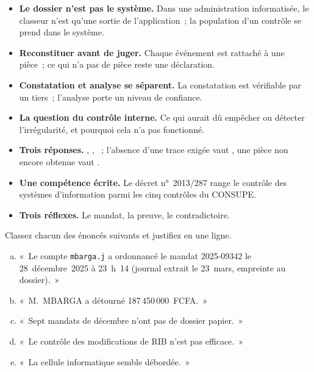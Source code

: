 \begin{boxresume}
\begin{itemize}
    \item \textbf{Le dossier n'est pas le système.} Dans une administration
          informatisée, le classeur n'est qu'une sortie de l'application~;
          la population d'un contrôle se prend dans le système.
    \item \textbf{Reconstituer avant de juger.} Chaque événement est
          rattaché à une pièce~; ce qui n'a pas de pièce reste une
          déclaration.
    \item \textbf{Constatation et analyse se séparent.} La constatation est
          vérifiable par un tiers~; l'analyse porte un niveau de
          confiance.
    \item \textbf{La question du contrôle interne.} Ce qui aurait dû
          empêcher ou détecter l'irrégularité, et pourquoi cela n'a pas
          fonctionné.
    \item \textbf{Trois réponses.} \OUI{}, \NON{}, \NEK{}~; l'absence d'une
          trace exigée vaut \NON{}, une pièce non encore obtenue vaut
          \NEK{}.
    \item \textbf{Une compétence écrite.} Le décret n°~2013/287 range le
          contrôle des systèmes d'information parmi les cinq contrôles du
          CONSUPE.
    \item \textbf{Trois réflexes.} Le mandat, la preuve, le contradictoire.
\end{itemize}
\end{boxresume}

\begin{boxexo}[title={\ding{45}\quad Exercice~P.1. Constatation ou analyse~? \niveaubase}]
Classez chacun des énoncés suivants et justifiez en une ligne.
\begin{enumerate}[(a)]
    \item «~Le compte \texttt{mbarga.j} a ordonnancé le mandat 2025-09342
          le 28~décembre~2025 à 23~h~14 (journal extrait le 23~mars,
          empreinte au dossier).~»
    \item «~M.~MBARGA a détourné 187\,450\,000~FCFA.~»
    \item «~Sept mandats de décembre n'ont pas de dossier papier.~»
    \item «~Le contrôle des modifications de RIB n'est pas efficace.~»
    \item «~La cellule informatique semble débordée.~»
\end{enumerate}
\end{boxexo}

